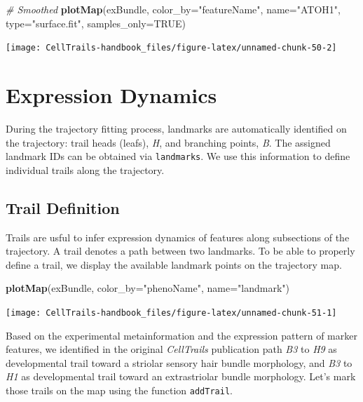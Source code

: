 \documentclass[]{book}
\newenvironment{Shaded}{\begin{snugshade}}{\end{snugshade}}
\newcommand{\KeywordTok}[1]{\textcolor[rgb]{0.13,0.29,0.53}{\textbf{#1}}}
\newcommand{\DataTypeTok}[1]{\textcolor[rgb]{0.13,0.29,0.53}{#1}}
\newcommand{\StringTok}[1]{\textcolor[rgb]{0.31,0.60,0.02}{#1}}
\newcommand{\CommentTok}[1]{\textcolor[rgb]{0.56,0.35,0.01}{\textit{#1}}}
\newcommand{\OtherTok}[1]{\textcolor[rgb]{0.56,0.35,0.01}{#1}}
\newcommand{\NormalTok}[1]{#1}
\theoremstyle{definition}
\theoremstyle{definition}
\theoremstyle{definition}
\theoremstyle{remark}
\begin{document}
\begin{Shaded}
\begin{Highlighting}[]
\CommentTok{# Smoothed}
\KeywordTok{plotMap}\NormalTok{(exBundle, }\DataTypeTok{color_by=}\StringTok{"featureName"}\NormalTok{, }\DataTypeTok{name=}\StringTok{"ATOH1"}\NormalTok{, }\DataTypeTok{type=}\StringTok{"surface.fit"}\NormalTok{, }
        \DataTypeTok{samples_only=}\OtherTok{TRUE}\NormalTok{)}
\end{Highlighting}
\end{Shaded}

\texttt{[image: CellTrails-handbook\_files/figure-latex/unnamed-chunk-50-2]}

\chapter{Expression Dynamics}\label{expression-dynamics}

During the trajectory fitting process, landmarks are automatically
identified on the trajectory: trail heads (leafs), \emph{H}, and
branching points, \emph{B}. The assigned landmark IDs can be obtained
via \texttt{landmarks}. We use this information to define individual
trails along the trajectory.

\section{Trail Definition}\label{trail-definition}

Trails are usful to infer expression dynamics of features along
subsections of the trajectory. A trail denotes a path between two
landmarks. To be able to properly define a trail, we display the
available landmark points on the trajectory map.

\begin{Shaded}
\begin{Highlighting}[]
\KeywordTok{plotMap}\NormalTok{(exBundle, }\DataTypeTok{color_by=}\StringTok{"phenoName"}\NormalTok{, }\DataTypeTok{name=}\StringTok{"landmark"}\NormalTok{)}
\end{Highlighting}
\end{Shaded}

\texttt{[image: CellTrails-handbook\_files/figure-latex/unnamed-chunk-51-1]}

Based on the experimental metainformation and the expression pattern of
marker features, we identified in the original \emph{CellTrails}
publication path \emph{B3} to \emph{H9} as developmental trail toward a
striolar sensory hair bundle morphology, and \emph{B3} to \emph{H1} as
developmental trail toward an extrastriolar bundle morphology. Let's
mark those trails on the map using the function \texttt{addTrail}.
\end{document}
